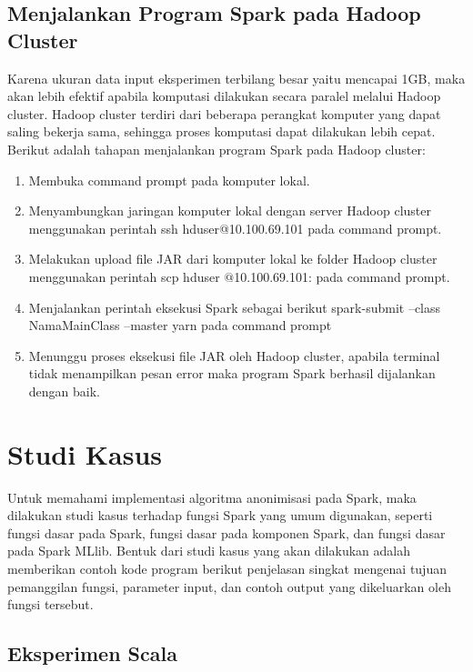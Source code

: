 \subsection{Menjalankan Program Spark pada Hadoop Cluster}
Karena ukuran data input eksperimen terbilang besar yaitu mencapai 1GB, maka akan lebih efektif apabila komputasi dilakukan secara paralel melalui Hadoop cluster. Hadoop cluster terdiri dari beberapa perangkat komputer yang dapat saling bekerja sama, sehingga proses komputasi dapat dilakukan lebih cepat.\\

\noindent Berikut adalah tahapan menjalankan program Spark pada Hadoop cluster:
\begin{enumerate}
\item Membuka command prompt pada komputer lokal.
\item Menyambungkan jaringan komputer lokal dengan server Hadoop cluster menggunakan perintah \textsf{ssh hduser@10.100.69.101} pada command prompt.
\item Melakukan upload file JAR dari komputer lokal ke folder Hadoop cluster menggunakan perintah \textsf{scp  hduser
$@$10.100.69.101:} pada command prompt.
\item Menjalankan perintah eksekusi Spark sebagai berikut \textsf{spark-submit --class NamaMainClass --master yarn } pada command prompt
\item Menunggu proses eksekusi file JAR oleh Hadoop cluster, apabila terminal tidak menampilkan pesan error maka program Spark berhasil dijalankan dengan baik.
\end{enumerate}

\newpage
\section{Studi Kasus}
Untuk memahami implementasi algoritma anonimisasi pada Spark, maka dilakukan studi kasus terhadap fungsi Spark yang umum digunakan, seperti fungsi dasar pada Spark, fungsi dasar pada komponen Spark, dan fungsi dasar pada Spark MLlib. Bentuk dari studi kasus yang akan dilakukan adalah memberikan contoh kode program berikut penjelasan singkat mengenai tujuan pemanggilan fungsi, parameter input, dan contoh output yang dikeluarkan oleh fungsi tersebut.

\subsection{Eksperimen Scala}

